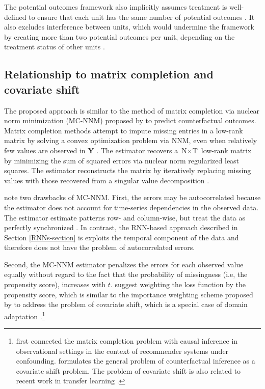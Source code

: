 \documentclass[hidelinks,12pt]{article}
\begin{document}
The potential outcomes framework also implicitly assumes treatment is well-defined to ensure that each unit has the same number of potential outcomes \citep{imbens2015causal}. It also excludes interference between units, which would undermine the framework by creating more than two potential outcomes per unit, depending on the treatment status of other units \citep{rubin1990}.

\subsection{Relationship to matrix completion and covariate shift}

The proposed approach is similar to the method of matrix completion via nuclear norm minimization (MC-NNM) proposed by \citet{athey2017matrix} to predict counterfactual outcomes. Matrix completion methods attempt to impute missing entries in a low-rank matrix by solving a convex optimization problem via NNM, even when relatively few values are observed in $\boldsymbol{Y}$ \citep{candes2009exact,candes2010matrix}. The estimator recovers a $\text{N} \times \text{T}$ low-rank matrix by minimizing the sum of squared errors via nuclear norm regularized least squares. The estimator reconstructs the matrix by iteratively replacing missing values with those recovered from a singular value decomposition \citep{mazumder2010spectral}. 

\citet{athey2017matrix} note two drawbacks of MC-NNM. First, the errors may be autocorrelated because the estimator does not account for time-series dependencies in the observed data. The estimator estimate patterns row- and column-wise, but treat the data as perfectly synchronized \citep{yoon2018estimating}. In contrast, the RNN-based approach described in Section \ref{RNNs-section} is exploits the temporal component of the data and therefore does not have the problem of autocorrelated errors. 

Second, the MC-NNM estimator penalizes the errors for each observed value equally without regard to the fact that the probability of missingness (i.e, the propensity score), increases with $t$. \citet{athey2017matrix} suggest weighting the loss function by the propensity score, which is similar to the importance weighting scheme proposed by \citet{cortes2008sample} to address the problem of covariate shift, which is a special case of domain adaptation \citep{huang2007correcting,bickel2009discriminative,cortes2010learning}.\footnote{\citet{schnabel2016recommendations} first connected the matrix completion problem with causal inference in observational settings in the context of recommender systems under confounding. \citet{johansson2016learning} formulates the general problem of counterfactual inference as a covariate shift problem. The problem of covariate shift is also related to recent work in transfer learning \citep{ben2007analysis,2015arXiv150507818G}.} 
\end{document}
